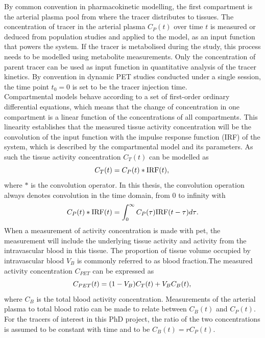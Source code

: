 By common convention in pharmacokinetic modelling, the first compartment is the arterial plasma pool from where the tracer distributes to tissues. The concentration of tracer in the arterial plasma $C_P(t)$ over time $t$ is measured or deduced from population studies and applied to the model, as an input function that powers the system.
If the tracer is metabolised during the study, this process needs to be modelled using metabolite measurements. Only the concentration of parent tracer can be used as input function in quantitative analysis of the tracer kinetics.
By convention in dynamic PET studies conducted under a single session, the time point $t_0=0$ is set to be the tracer injection time. \\
Compartmental models behave according to a set of first-order ordinary differential equations, which means that the change of concentration in one compartment is a linear function of the concentrations of all compartments. This linearity establishes that the measured tissue activity concentration will be the convolution of the input function with the impulse response function (IRF) of the system, which is described by the compartmental model and its parameters.
As such the tissue activity concentration $C_T(t)$ can be modelled as
\begin{equation}
 C_T(t) = C_P(t) \ast \textrm{IRF}(t)  \\ , \\ 
\end{equation}
where $\ast$ is the convolution operator. In this thesis, the convolution operation always denotes convolution in the time domain, from 0 to infinity with
\begin{equation}
C_P(t) \ast \textrm{IRF}(t) = \int_{0}^{\infty} C_P(\tau) \textrm{IRF}(t-\tau) d\tau \  \\ . \\ 
\end{equation}
When a measurement of activity concentration is made with \gls{pet}, the measurement will include the underlying tissue activity and activity from the intravascular blood in this tissue. The proportion of tissue volume occupied by intravascular blood $V_B$ is commonly referred to as blood fraction.The measured activity concentration $C_{PET}$ can be expressed as
\begin{equation}
{C_{PET}}(t)  = (1-V_{B}){C_{T}}(t) + V_{B}C_{B}(t) \\ , \\
\label{eqn:CPET}
\end{equation}
where $C_{B}$ is the total blood activity concentration.
Measurements of the %
arterial plasma to total blood ratio can be made to relate between $C_{B}(t)$ and $C_P(t)$. 
For the tracers of interest in this PhD project, the ratio of the two concentrations is assumed to be constant with time and to be $C_{B}(t) = r C_{P}(t)$. 

